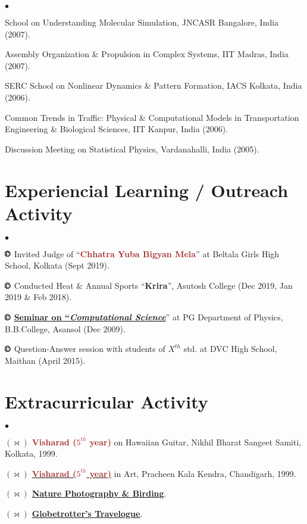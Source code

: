 \documentclass[margin,line]{res}
\newenvironment{list2}{
  \begin{list}{$\bullet$}{%
      \setlength{\itemsep}{0in}
      \setlength{\parsep}{0in} \setlength{\parskip}{0in}
      \setlength{\topsep}{0in} \setlength{\partopsep}{0in} 
      \setlength{\leftmargin}{0.2in}}}{\end{list}}
\begin{document}
\begin{resume}
\begin{list2}
\item {\small School on Understanding Molecular Simulation, JNCASR Bangalore, India (2007).} 
\item {\small Assembly Organization \& Propulsion in Complex Systems, IIT Madras, India (2007).}
\item {\small SERC School on Nonlinear Dynamics \& Pattern Formation, IACS Kolkata, India (2006).} 
\item {\small Common Trends in Traffic: Physical \& Computational Models in Transportation Engineering \& Biological Sciences, IIT Kanpur, 
      India (2006).} 
\item {\small Discussion Meeting on Statistical Physics, Vardanahalli, India (2005).}
\end{list2}

\section{\sc Experiencial Learning / Outreach Activity}
\begin{list2}

\item[$\pmb\copyright$] {\small Invited Judge of ``\textcolor{brown}{\sf \bf Chhatra Yuba Bigyan Mela}'' at Beltala Girls High School, 
      Kolkata (Sept 2019).}  
\item[$\pmb\copyright$] {\small Conducted Heat \& Annual Sports ``\textcolor{auburn}{\sc \bf Krira}'', Asutosh College (Dec 2019, Jan 2019 \& Feb 2018).}
\item[$\pmb\copyright$] {\small \href{https://www.slideshare.net/AmitBhattacharjee14/computational-liquid-crystal-physics}{\bf Seminar on 
      ``\textcolor{skblue}{\it Computational Science}}'' at PG Department of Physics, B.B.College, Asansol (Dec 2009).}
\item[$\pmb\copyright$] {\small Question-Answer session with students of $X^{th}$ std. at DVC High School, Maithan (April 2015).}
\end{list2}

\section{\sc Extracurricular Activity} 
\begin{list2}
\item[$\pmb{(\Join)}$] \textcolor{brown}{\bf Visharad ($5^{th}$ year)} on Hawaiian Guitar, Nikhil Bharat Sangeet Samiti, Kolkata, 1999. 
\item[$\pmb{(\Join)}$] \href{https://amitbny.github.io/akb.github.io/picture/chitrabisharad.pdf}{\textcolor{brown}{\bf Visharad (\bf $5^{th}$ 
                       year)}} in Art, Pracheen Kala Kendra, Chandigarh, 1999. 
\item[$\pmb{(\Join)}$] \href{https://500px.com/amitbhattacharjee}{\bf Nature Photography \& Birding}. 
\item[$\pmb{(\Join)}$] \href{https://www.tripoto.com/profile/amitbhattacharjee}{\bf Globetrotter's Travelogue}. 
\end{list2}

\end{resume}
\end{document}
